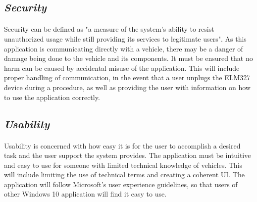 	\subsection*{\textit{Security}}
		\paragraph{}{
		Security can be defined as "a measure of the system's ability to resist unauthorized usage while still providing its services to legitimate users"\cite{SAinP}. As this application is communicating directly with a vehicle, there may be a danger of damage being done to the vehicle and its components. It must be ensured that no harm can be caused by accidental misuse of the application. This will include proper handling of communication, in the event that a user unplugs the ELM327 device during a procedure, as well as providing the user with information on how to use the application correctly.
		}		
	\subsection*{\textit{Usability}}
		\paragraph{}{
		Usability is concerned with how easy it is for the user to accomplish a desired task and the user support the system provides\cite{SAinP}. The application must be intuitive and easy to use for someone with limited technical knowledge of vehicles. This will include limiting the use of technical terms and creating a coherent UI. The application will follow Microsoft's user experience guidelines, so that users of other Windows 10 application will find it easy to use.
		}

